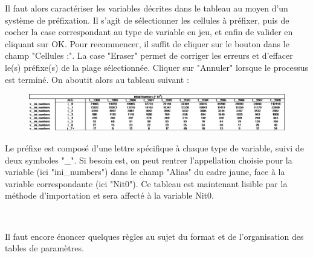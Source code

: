 \documentclass[12pt, colorinlistoftodos, notitlepage]{report}
\newenvironment{not used}[1]{%
    \longtable{%
        |>{\centering$\displaystyle}A{#1}{1}<{$}%
        |}\hline\ignorespaces}{%
    \endlongtable\ignorespacesafterend}
\begin{document}
Il faut alors caractériser les variables décrites dans le tableau au moyen d'un système de préfixation. Il s'agit de sélectionner les cellules à préfixer, puis de cocher la case correspondant au type de variable en jeu, et enfin de valider en cliquant sur OK. Pour recommencer, il suffit de cliquer sur le bouton dans le champ "Cellules :". La case "Eraser" permet de corriger les erreurs et d'effacer le(s) préfixe(s) de la plage sélectionnée. Cliquer sur "Annuler" lorsque le processus est terminé. On aboutit alors au tableau suivant :

\begin{figure}[h!]
    \begin{center}
    \includegraphics[width = \textwidth]{figures/param/stock4.png}
    \end{center}
    \label{fig:cancel}
\end{figure}
        
Le préfixe est composé d'une lettre spécifique à chaque type de variable, suivi de deux symboles "\_". Si besoin est, on peut rentrer l'appellation choisie pour la variable (ici "ini\_numbers") dans le champ "Alias" du cadre jaune, face à la variable correspondante (ici "Nit0"). Ce tableau est maintenant lisible par la méthode d'importation et sera affecté à la variable Nit0.

\par~\par

Il faut encore énoncer quelques règles au sujet du format et de l'organisation des tables de paramètres.
\end{document}
